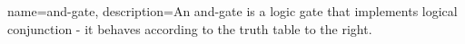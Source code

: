 {
    name=and-gate,
    description={An and-gate is a logic gate that implements logical conjunction - it behaves according to the truth table to the right.}
}
